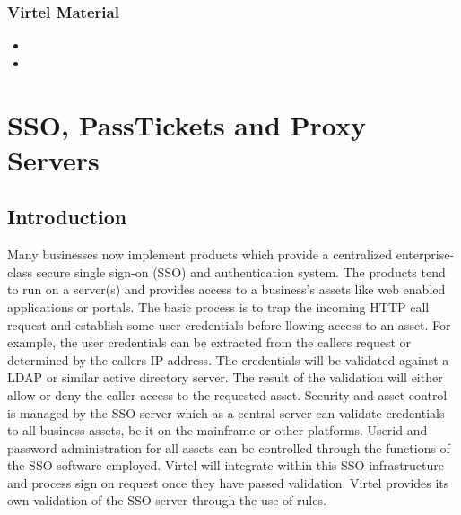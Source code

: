 \documentclass[letterpaper,10pt,english]{sphinxmanual}
\begin{document}
\subsection{Virtel Material}
\label{\detokenize{connectivity_guide:virtel-material}}\begin{itemize}
\item {} 

\item {} 

\end{itemize}


\chapter{SSO, PassTickets and Proxy Servers}
\label{\detokenize{connectivity_guide:index-163}}\label{\detokenize{connectivity_guide:sso-passtickets-and-proxy-servers}}

\section{Introduction}
\label{\detokenize{connectivity_guide:id74}}
Many businesses now implement products which provide a centralized enterprise-class secure single sign-on (SSO) and authentication system. The products tend to run on a server(s) and provides access to a business’s assets like web enabled applications or portals. The basic process is to trap the incoming HTTP call request and establish some user credentials before llowing access to an asset. For example, the user credentials can be extracted from the callers request or determined by the callers IP address. The credentials will be validated against a LDAP or similar active directory server. The result of the validation will either allow or deny the caller access to the requested asset. Security and asset control is managed by the SSO server which as a central server can validate credentials to all business assets, be it on the mainframe or other platforms. Userid and password administration for all assets can be controlled through the functions of the SSO software employed. Virtel will integrate within this SSO infrastructure and process sign on request once they have passed validation. Virtel provides its own validation of the SSO server through the use of rules.
\end{document}

